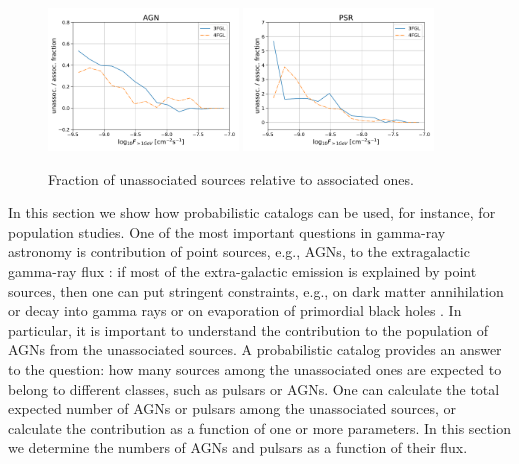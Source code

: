 \begin{figure}[h]
\center
\includegraphics[width=0.45\textwidth]{plots/N_logS_diff_AGN.pdf}
\includegraphics[width=0.45\textwidth]{plots/N_logS_diff_PSR.pdf}
\caption{Fraction of unassociated sources relative to associated ones.}  
\label{fig:unass_vs_ass_frac}
\end{figure}



In this section we show how probabilistic catalogs can be used, for instance, for population studies.
One of the most important questions in gamma-ray astronomy is contribution of point sources, 
e.g., AGNs, to the extragalactic gamma-ray flux \citep[e.g.,][]{2010ApJ...720..435A, 2011ApJ...738..181M, 2016PhRvL.116o1105A, 2016ApJS..225...18Z, 2016ApJ...826L..31Z, 2016ApJ...832..117L, 2018ApJ...856..106D}:
if most of the extra-galactic emission is explained by point sources, then one can put stringent constraints, 
e.g., on  dark matter annihilation or decay into gamma rays 
\citep{2015ApJ...800L..27A, 2015PhRvD..91l3001D, 2015JCAP...09..008F, 2015PhR...598....1F, 2017ChPhC..41d5104L} or 
on evaporation of primordial black holes \citep{2010PhRvD..81j4019C}.
In particular, it is important to understand the contribution to the population of AGNs from the unassociated sources.
A probabilistic catalog provides an answer to the question: how many sources among the unassociated ones are expected to belong to different classes, such as pulsars or AGNs. 
One can calculate the total expected number of AGNs or pulsars among the unassociated sources, or calculate the contribution as a function of one or more parameters.
In this section we determine the numbers of AGNs and pulsars as a function of their flux.

